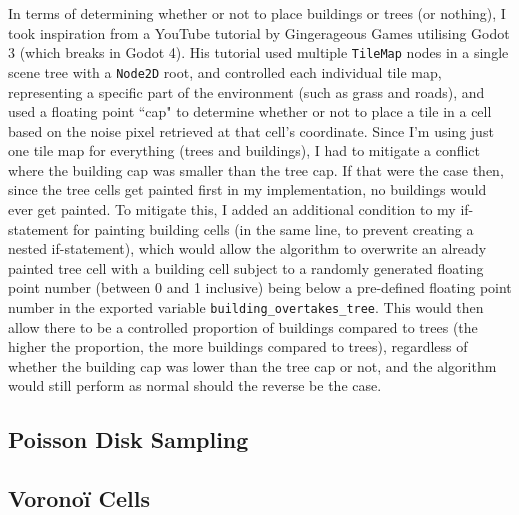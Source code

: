 In terms of determining whether or not to place buildings or trees (or nothing), I took inspiration from a YouTube tutorial by Gingerageous Games utilising Godot 3\cite{gingergd3tutorialYT}\cite{gingergd3tutorialGH} (which breaks in Godot 4). His tutorial used multiple \verb|TileMap| nodes in a single scene tree with a \verb|Node2D| root, and controlled each individual tile map, representing a specific part of the environment (such as grass and roads), and used a floating point ``cap" to determine whether or not to place a tile in a cell based on the noise pixel retrieved at that cell's coordinate.\cite{gingergd3tutorialYT}\cite{gingergd3tutorialGH} Since I'm using just one tile map for everything (trees and buildings), I had to mitigate a conflict where the building cap was smaller than the tree cap. If that were the case then, since the tree cells get painted first in my implementation, no buildings would ever get painted. To mitigate this, I added an additional condition to my if-statement for painting building cells (in the same line, to prevent creating a nested if-statement), which would allow the algorithm to overwrite an already painted tree cell with a building cell subject to a randomly generated floating point number (between 0 and 1 inclusive) being below a pre-defined floating point number in the exported variable \verb|building_overtakes_tree|. This would then allow there to be a controlled proportion of buildings compared to trees (the higher the proportion, the more buildings compared to trees), regardless of whether the building cap was lower than the tree cap or not, and the algorithm would still perform as normal should the reverse be the case.   

\subsection{Poisson Disk Sampling}



\subsection{Voronoï Cells}

